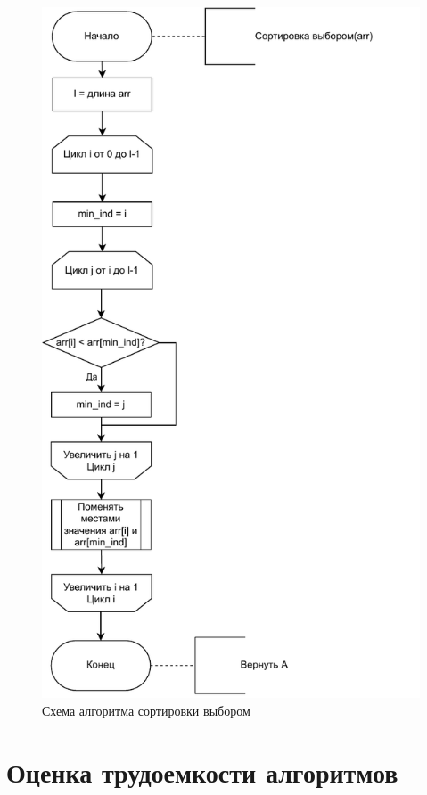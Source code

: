 \begin{figure}[H]
	\centering
	\includegraphics[scale=1]{assets/selectionsort.pdf}
	\caption{Схема алгоритма сортировки выбором}
	\label{pic:selectionsort}
\end{figure}

\newpage


\section{Оценка трудоемкости алгоритмов}

